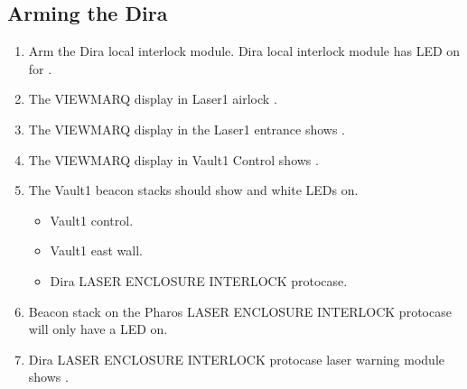 \documentclass[letterpaper,10pt,english]{sphinxmanual}
\begin{document}
\subsection{Arming the Dira}
\label{\detokenize{testing_documentation/Laser-1:arming-the-dira}}\begin{enumerate}
%
\item {} 
\sphinxAtStartPar
Arm the Dira local interlock module.
Dira local interlock module has LED on for .

\item {} 
\sphinxAtStartPar
The VIEWMARQ display in Laser\sphinxhyphen{}1 airlock .

\item {} 
\sphinxAtStartPar
The VIEWMARQ display in the Laser\sphinxhyphen{}1 entrance shows .

\item {} 
\sphinxAtStartPar
The VIEWMARQ display in Vault\sphinxhyphen{}1 Control shows  \sphinxhyphen{} .

\item {} 
\sphinxAtStartPar
The Vault\sphinxhyphen{}1 beacon stacks should show  and white LEDs on.
\begin{itemize}
\item {} 
\sphinxAtStartPar
Vault\sphinxhyphen{}1 control.

\item {} 
\sphinxAtStartPar
Vault\sphinxhyphen{}1 east wall.

\item {} 
\sphinxAtStartPar
Dira LASER ENCLOSURE INTERLOCK protocase.

\end{itemize}

\item {} 
\sphinxAtStartPar
Beacon stack on the Pharos LASER ENCLOSURE INTERLOCK protocase will only have a  LED on.

\item {} 
\sphinxAtStartPar
Dira LASER ENCLOSURE INTERLOCK protocase laser warning module shows .

\end{enumerate}
\end{document}
